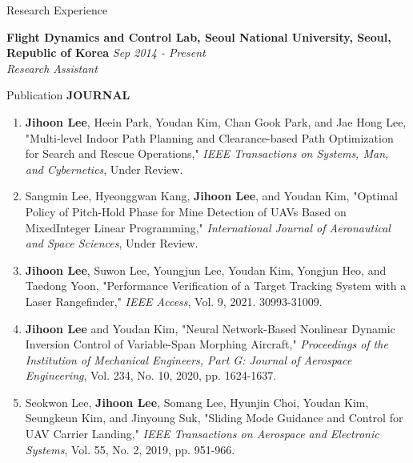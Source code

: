 \documentclass{resume}
\begin{document}
\begin{rSection}{Research Experience}

{\bf Flight Dynamics and Control Lab, Seoul National University, Seoul, Republic of Korea} \hfill {\em Sep 2014 - Present} 
\\{\textit{Research Assistant}}

\end{rSection}

\begin{rSection}{Publication}
	\textbf{JOURNAL}
	\begin{enumerate}\renewcommand{\labelenumi}{[J\theenumi]}
		\item \textbf{Jihoon Lee}, Heein Park, Youdan Kim, Chan Gook Park, and Jae Hong Lee, "Multi-level Indoor Path Planning and Clearance-based Path Optimization for Search and Rescue Operations," \textit{IEEE Transactions on Systems, Man, and Cybernetics}, Under Review.
		
		\item Sangmin Lee, Hyeonggwan Kang, \textbf{Jihoon Lee}, and Youdan Kim, "Optimal Policy of Pitch-Hold Phase for Mine Detection of UAVs Based on MixedInteger Linear Programming," \textit{International Journal of Aeronautical and Space Sciences}, Under Review.
		
		\item \textbf{Jihoon Lee}, Suwon Lee, Youngjun Lee, Youdan Kim, Yongjun Heo, and Taedong Yoon, "Performance Veriﬁcation of a Target Tracking System with a Laser Rangeﬁnder," \textit{IEEE Access}, Vol. 9, 2021. 30993-31009.  
		
		\item \textbf{Jihoon Lee} and Youdan Kim, "Neural Network-Based Nonlinear Dynamic Inversion Control of Variable-Span Morphing Aircraft," \textit{Proceedings of the Institution of Mechanical Engineers, Part G: Journal of Aerospace Engineering}, Vol. 234, No. 10, 2020, pp. 1624-1637. \newline[DOI: 10.1177/0954410019846713]
		
		\item Seokwon Lee, \textbf{Jihoon Lee}, Somang Lee, Hyunjin Choi, Youdan Kim, Seungkeun Kim, and Jinyoung Suk, "Sliding Mode Guidance and Control for UAV Carrier Landing," \textit{IEEE Transactions on Aerospace and Electronic Systems}, Vol. 55, No. 2, 2019, pp. 951-966. 
	\end{enumerate}\renewcommand{\labelenumi}{\theenumi.}
	

\end{rSection}
\end{document}
